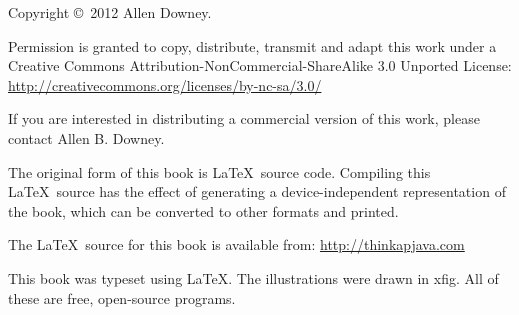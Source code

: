 \pagebreak
\thispagestyle{empty}

Copyright \copyright ~2012 Allen Downey.

\vspace{0.25in}

Permission is granted to copy, distribute, transmit and adapt
this work under a Creative Commons
Attribution-NonCommercial-ShareAlike 3.0 Unported License:
\url{http://creativecommons.org/licenses/by-nc-sa/3.0/}

If you are interested in distributing a commercial version of this
work, please contact Allen B. Downey.

The original form of this book is \LaTeX\ source code.  Compiling this
\LaTeX\ source has the effect of generating a device-independent
representation of the book, which can be converted to other formats
and printed.

The \LaTeX\ source for this book is available from:
\url{http://thinkapjava.com}

This book was typeset using \LaTeX .  The illustrations were
drawn in xfig.  All of these are free, open-source programs.

\vspace{0.25in}
